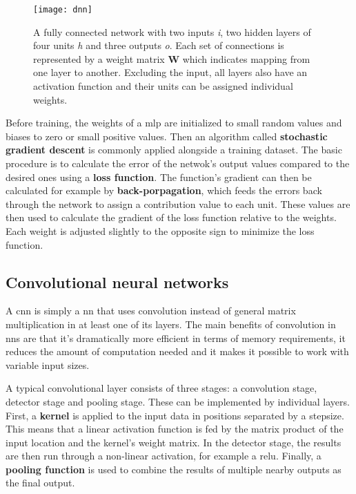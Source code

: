 \begin{figure}[H]
\centering
\texttt{[image: dnn]}
\caption{A fully connected network with two inputs \textit{i}, two hidden layers of
         four units \textit{h} and three outputs \textit{o}. Each set of connections
         is represented by a weight matrix \textbf{W} which indicates mapping from one
         layer to another. Excluding the input, all layers also have an activation
         function and their units can be assigned individual weights.}
\end{figure}

Before training, the weights of a \ac{mlp} are initialized to small random values and 
biases to zero or small positive values. Then an algorithm called \textbf{stochastic
gradient descent} is commonly applied alongside a training dataset. The basic procedure
is to calculate the error of the netwok's output values compared to the desired ones 
using a \textbf{loss function}. The function's gradient can then be calculated for
example by \textbf{back-porpagation}, which feeds the errors back through the network
to assign a contribution value to each unit. These values are then used to calculate
the gradient of the loss function relative to the weights. Each weight is adjusted
slightly to the opposite sign to minimize the loss function.

\subsection{Convolutional neural networks}\label{ssec:dlcnn}

A \ac{cnn} is simply a \ac{nn} that uses convolution instead of general matrix
multiplication in at least one of its layers. The main benefits of convolution in \ac{nn}s
are that it's dramatically more efficient in terms of memory requirements, it reduces
the amount of computation needed and it makes it possible to work with variable input
sizes.

A typical convolutional layer consists of three stages: a convolution stage, detector
stage and pooling stage. These can be implemented by individual layers. First, a
\textbf{kernel} is applied to the input data in positions separated by a stepsize. This
means that a linear activation function is fed by the matrix product of the input location
and the kernel's weight matrix. In the detector stage, the results are then run through
a non-linear activation, for example a \ac{relu}. Finally, a \textbf{pooling function}
is used to combine the results of multiple nearby outputs as the final output.

